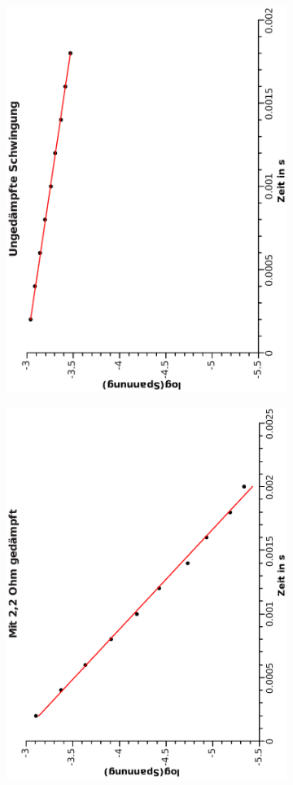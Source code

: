 \documentclass{article}
\begin{document}
\begin{figure}
\begin{subfigure}{0.5\textwidth}
\includegraphics[width=0.9\linewidth ,angle=-90]{ungesing.eps}
\end{subfigure}
\begin{subfigure}{0.5\textwidth}
\includegraphics[width=0.9\linewidth ,angle=-90]{gesing.eps}

\end{subfigure}
\end{figure}
\end{document}
